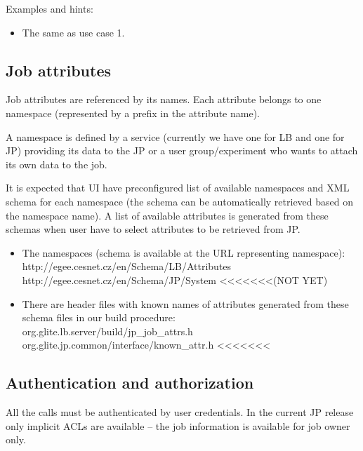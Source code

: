 Examples and hints:
\begin{itemize}
 \item The same as use case 1.
\end{itemize}


\subsection{Job attributes}
\label{attributes}
Job attributes are referenced by its names. Each attribute belongs to
one namespace (represented by a prefix in the attribute name).

A namespace is defined by a service (currently we have one for LB and
one for JP) providing its data to the JP or a user group/experiment
who wants to attach its own data to the job.

It is expected that UI have preconfigured list of available namespaces
and XML schema for each namespace (the schema can be automatically
retrieved based on the namespace name). A list of available attributes
is generated from these schemas when user have to select attributes to
be retrieved from JP.

\begin{itemize}
 \item The namespaces (schema is available at the URL representing namespace):\\
  http://egee.cesnet.cz/en/Schema/LB/Attributes\\
  http://egee.cesnet.cz/en/Schema/JP/System   <<<<<<<(NOT YET)\\
 \item There are header files with known names of attributes generated from
  these schema files in our build procedure:\\
  org.glite.lb.server/build/jp\_job\_attrs.h\\
  org.glite.jp.common/interface/known\_attr.h  <<<<<<<\\
\end{itemize}


\subsection{Authentication and authorization}
All the calls must be authenticated by user credentials. In the
current JP release only implicit ACLs are available -- the job
information is available for job owner only.


